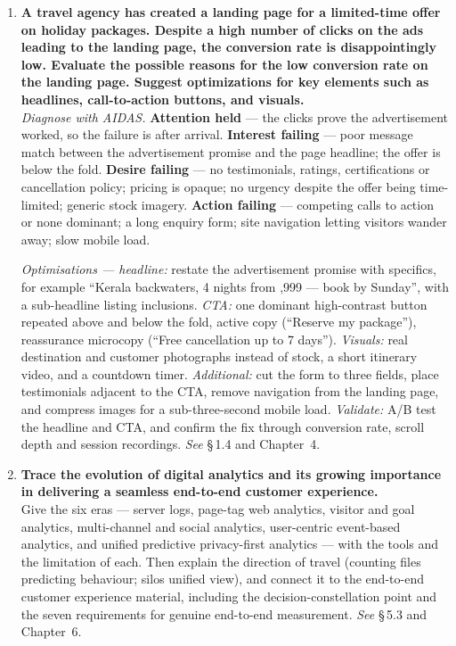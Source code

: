 \begin{enumerate}[leftmargin=2.2em,itemsep=1.4ex]
\item \textbf{A travel agency has created a landing page for a limited-time offer
      on holiday packages. Despite a high number of clicks on the ads leading to
      the landing page, the conversion rate is disappointingly low. Evaluate the
      possible reasons for the low conversion rate on the landing page. Suggest
      optimizations for key elements such as headlines, call-to-action buttons,
      and visuals.} \\
      \emph{Diagnose with AIDAS.} \textbf{Attention held} --- the clicks prove the
      advertisement worked, so the failure is after arrival. \textbf{Interest
      failing} --- poor message match between the advertisement promise and the
      page headline; the offer is below the fold. \textbf{Desire failing} --- no
      testimonials, ratings, certifications or cancellation policy; pricing is
      opaque; no urgency despite the offer being time-limited; generic stock
      imagery. \textbf{Action failing} --- competing calls to action or none
      dominant; a long enquiry form; site navigation letting visitors wander away;
      slow mobile load.

      \emph{Optimisations --- headline:} restate the advertisement promise with
      specifics, for example ``Kerala backwaters, 4 nights from ,999 ---
      book by Sunday'', with a sub-headline listing inclusions.
      \emph{CTA:} one dominant high-contrast button repeated above and below the
      fold, active copy (``Reserve my package''), reassurance microcopy (``Free
      cancellation up to 7 days'').
      \emph{Visuals:} real destination and customer photographs instead of stock, a
      short itinerary video, and a countdown timer.
      \emph{Additional:} cut the form to three fields, place testimonials adjacent
      to the CTA, remove navigation from the landing page, and compress images for
      a sub-three-second mobile load.
      \emph{Validate:} A/B test the headline and CTA, and confirm the fix through
      conversion rate, scroll depth and session recordings.
      \hfill\emph{See} \S\,1.4 and Chapter~4.

\item \textbf{Trace the evolution of digital analytics and its growing importance
      in delivering a seamless end-to-end customer experience.}
      \\
      Give the six eras --- server logs, page-tag web analytics, visitor and goal
      analytics, multi-channel and social analytics, user-centric event-based
      analytics, and unified predictive privacy-first analytics --- with the tools
      and the limitation of each. Then explain the direction of travel (counting
      files \ra{} predicting behaviour; silos \ra{} unified view), and connect it
      to the end-to-end customer experience material, including the
      decision-constellation point and the seven requirements for genuine
      end-to-end measurement. \hfill\emph{See} \S\,5.3 and Chapter~6.


\end{enumerate}
